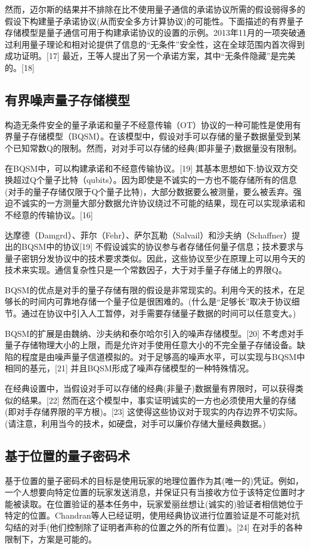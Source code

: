 然而，迈尔斯的结果并不排除在比不使用量子通信的承诺协议所需的假设弱得多的假设下构建量子承诺协议(从而安全多方计算协议)的可能性。下面描述的有界量子存储模型是量子通信可用于构建承诺协议的设置的示例。2013年11月的一项突破通过利用量子理论和相对论提供了信息的“无条件”安全性，这在全球范围内首次得到成功证明。[17] 最近，王等人提出了另一个承诺方案，其中“无条件隐藏”是完美的。[18]

\subsection{有界噪声量子存储模型}
构造无条件安全的量子承诺和量子不经意传输（OT）协议的一种可能性是使用有界量子存储模型（BQSM）。在该模型中，假设对手可以存储的量子数据量受到某个已知常数Q的限制。然而，对对手可以存储的经典(即非量子)数据量没有限制。

在BQSM中，可以构建承诺和不经意传输协议。[19] 其基本思想如下:协议双方交换超过Q个量子比特（qubits）。因为即使是不诚实的一方也不能存储所有的信息(对手的量子存储仅限于Q个量子比特)，大部分数据要么被测量，要么被丢弃。强迫不诚实的一方测量大部分数据允许协议绕过不可能的结果，现在可以实现承诺和不经意的传输协议。[16]

达摩德（Damgrd）、菲尔（Fehr）、萨尔瓦勒（Salvail）和沙夫纳（Schaffner）提出的BQSM中的协议[19] 不假设诚实的协议参与者存储任何量子信息；技术要求与量子密钥分发协议中的技术要求类似。因此，这些协议至少在原理上可以用今天的技术来实现。通信复杂性只是一个常数因子，大于对手量子存储上的界限Q。

BQSM的优点是对手的量子存储有限的假设是非常现实的。利用今天的技术，在足够长的时间内可靠地存储一个量子位是很困难的。(什么是“足够长”取决于协议细节。通过在协议中引入人工暂停，对手需要存储量子数据的时间可以任意变大。)

BQSM的扩展是由魏纳、沙夫纳和泰尔哈尔引入的噪声存储模型。[20] 不考虑对手量子存储物理大小的上限，而是允许对手使用任意大小的不完全量子存储设备。缺陷的程度是由噪声量子信道模拟的。对于足够高的噪声水平，可以实现与BQSM中相同的基元，[21] 并且BQSM形成了噪声存储模型的一种特殊情况。

在经典设置中，当假设对手可以存储的经典(非量子)数据量有界限时，可以获得类似的结果。[22] 然而在这个模型中，事实证明诚实的一方也必须使用大量的存储(即对手存储界限的平方根)。[23] 这使得这些协议对于现实的内存边界不切实际。(请注意，利用当今的技术，如硬盘，对手可以廉价存储大量经典数据。)

\subsection{基于位置的量子密码术}
基于位置的量子密码术的目标是使用玩家的地理位置作为其(唯一的)凭证。例如，一个人想要向特定位置的玩家发送消息，并保证只有当接收方位于该特定位置时才能被读取。在位置验证的基本任务中，玩家爱丽丝想让(诚实的)验证者相信她位于特定的位置。Chandran等人已经证明，使用经典协议进行位置验证是不可能对抗勾结的对手(他们控制除了证明者声称的位置之外的所有位置)。[24] 在对手的各种限制下，方案是可能的。

